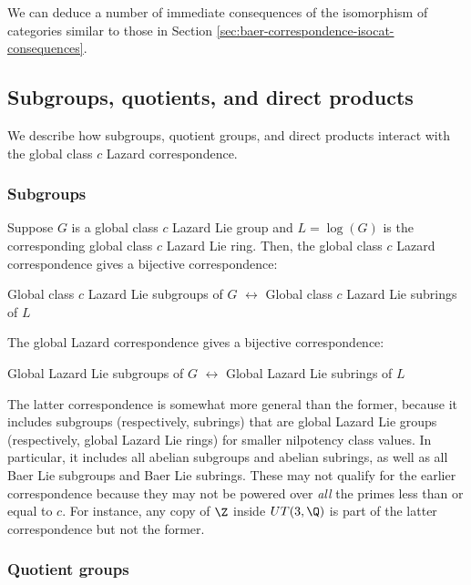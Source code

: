 \documentclass{ucetd}
\begin{document}
We can deduce a number of immediate consequences of the isomorphism of
categories similar to those in Section
\ref{sec:baer-correspondence-isocat-consequences}.

\subsection{Subgroups, quotients, and direct products}\label{sec:global-lazard-correspondence-sub-quot-dp}

We describe how subgroups, quotient groups, and direct products
interact with the global class $c$ Lazard correspondence.

\subsubsection{Subgroups}\label{sec:global-lazard-correspondence-subgroups}

Suppose $G$ is a global class $c$ Lazard Lie group and $L = \log(G)$
is the corresponding global class $c$ Lazard Lie ring. Then, the
global class $c$ Lazard correspondence gives a bijective
correspondence:

\begin{center}
  Global class $c$ Lazard Lie subgroups of $G$ $\leftrightarrow$
  Global class $c$ Lazard Lie subrings of $L$
\end{center}

The global Lazard correspondence gives a bijective correspondence:

\begin{center}
  Global Lazard Lie subgroups of $G$ $\leftrightarrow$
  Global Lazard Lie subrings of $L$
\end{center}

The latter correspondence is somewhat more general than the former,
because it includes subgroups (respectively, subrings) that are global
Lazard Lie groups (respectively, global Lazard Lie rings) for smaller
nilpotency class values. In particular, it includes all abelian
subgroups and abelian subrings, as well as all Baer Lie subgroups and
Baer Lie subrings. These may not qualify for the earlier
correspondence because they may not be powered over {\em all} the
primes less than or equal to $c$. For instance, any copy of $\Z$
inside $UT(3,\Q)$ is part of the latter correspondence but not the
former.

\subsubsection{Quotient groups}\label{sec:global-lazard-correspondence-quot}
\end{document}
